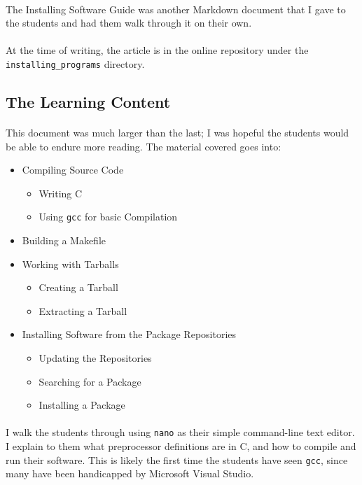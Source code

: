 \documentclass[11pt]{article}
\begin{document}
	\paragraph{} The Installing Software Guide was another Markdown document that I gave to the students and had them walk through it on their own.

	\paragraph{} At the time of writing, the article is in the online repository under the \texttt{installing\_programs} directory.

	\subsection{The Learning Content}	

	\paragraph{} This document was much larger than the last; I was hopeful the students would be able to endure more reading. The material covered goes into:

	\begin{itemize}
		\item Compiling Source Code
		\begin{itemize}
			\item Writing C
			\item Using \texttt{gcc} for basic Compilation
		\end{itemize}
		\item Building a Makefile
		\item Working with Tarballs
		\begin{itemize}
			\item Creating a Tarball
			\item Extracting a Tarball
		\end{itemize}
		\item Installing Software from the Package Repositories
		\begin{itemize}
			\item Updating the Repositories
			\item Searching for a Package
			\item Installing a Package
		\end{itemize}
	\end{itemize}

	\paragraph{} I walk the students through using \texttt{nano} as their simple command-line text editor. I explain to them what preprocessor definitions are in C, and how to compile and run their software. This is likely the first time the students have seen \texttt{gcc}, since many have been handicapped by Microsoft Visual Studio.
\end{document}

